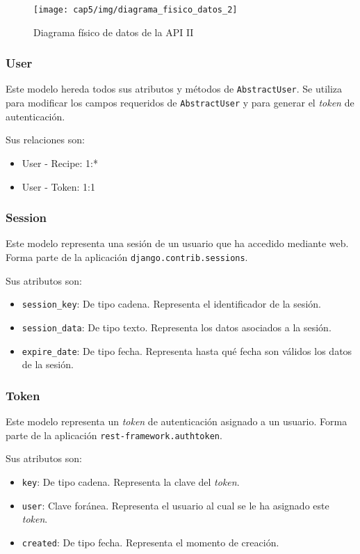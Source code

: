 \begin{figure}[htbp]
  \centering
  \texttt{[image: cap5/img/diagrama\_fisico\_datos\_2]}
  \caption{Diagrama físico de datos de la API II}
  \label{fig:diagrama-fisico-datos-2}
\end{figure}

\subsubsection{User}

Este modelo hereda todos sus atributos y métodos de \texttt{AbstractUser}. Se
utiliza para modificar los campos requeridos de \texttt{AbstractUser} y para
generar el \textit{token} de autenticación.

Sus relaciones son:
\begin{itemize}
\item User - Recipe: 1:*
\item User - Token: 1:1 
\end{itemize}

\subsubsection{Session}

Este modelo representa una sesión de un usuario que ha accedido mediante web.
Forma parte de la aplicación \texttt{django.contrib.sessions}.

Sus atributos son:
\begin{itemize}
\item \texttt{session\_key}: De tipo cadena. Representa el identificador de la
  sesión.
\item \texttt{session\_data}: De tipo texto. Representa los datos asociados a la
  sesión.
\item \texttt{expire\_date}: De tipo fecha. Representa hasta qué fecha son
  válidos los datos de la sesión.
\end{itemize}

\subsubsection{Token}

Este modelo representa un \textit{token} de autenticación asignado a un usuario.
Forma parte de la aplicación \texttt{rest-framework.authtoken}.

Sus atributos son:
\begin{itemize}
\item \texttt{key}: De tipo cadena. Representa la clave del \textit{token}.
\item \texttt{user}: Clave foránea. Representa el usuario al cual se le ha
  asignado este \textit{token}.
\item \texttt{created}: De tipo fecha. Representa el momento de creación.
\end{itemize}

